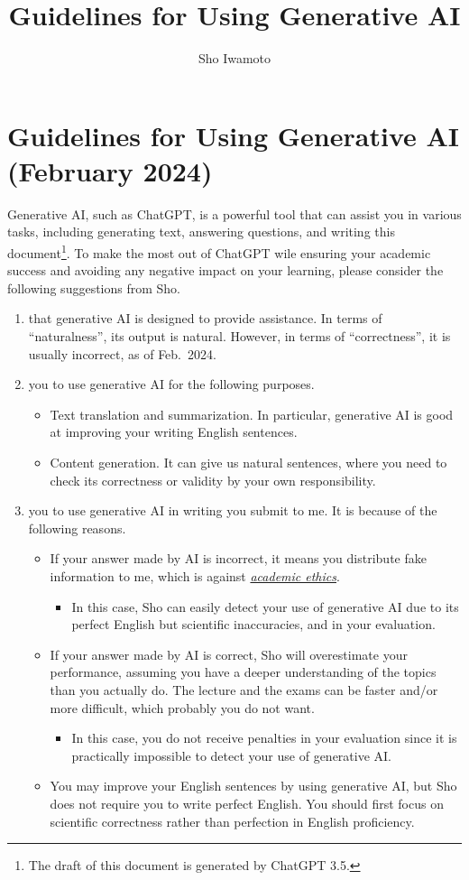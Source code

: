 \documentclass[11pt,pdfa,lastpage]{MishoNote}
\title{Guidelines for Using Generative AI}
\author{Sho Iwamoto}
\begin{document}
\section*{Guidelines for Using Generative AI (February 2024)}

Generative AI, such as ChatGPT, is a powerful tool that can assist you in various tasks, including generating text, answering questions, and writing this document\footnote{The draft of this document is generated by ChatGPT 3.5.}.
To make the most out of ChatGPT wile ensuring your academic success and avoiding any negative impact on your learning, please consider the following suggestions from Sho.
\begin{enumerate}
 \item {} that generative AI is designed to provide assistance.  In terms of ``naturalness'', its output is natural. However, in terms of ``correctness'', it is usually incorrect, as of Feb.~2024.
 \item {} you to use generative AI for the following purposes.
\begin{itemize}
 \item Text translation and summarization. In particular, generative AI is good at improving your writing English sentences.
 \item Content generation. It can give us natural sentences, where you need to check its correctness or validity by your own responsibility.
\end{itemize}
 \item {} you to use generative AI in writing  you submit to me. It is because of the following reasons.
\begin{itemize}
 \item If your answer made by AI is incorrect, it means you distribute fake information to me, which is against \href{https://oaa.nsysu.edu.tw/var/file/3/1003/img/1296/acade_rule_27.pdf}{\em academic ethics}.
\begin{itemize}
 \item In this case, Sho can easily detect your use of generative AI due to its perfect English but scientific inaccuracies, and  in your evaluation.
\end{itemize}
 \item If your answer made by AI is correct, Sho will overestimate your performance, assuming you have a deeper understanding of the topics than you actually do. The lecture and the exams can be faster and/or more difficult, which probably you do not want.
\begin{itemize}
 \item In this case, you do not receive penalties in your evaluation since it is practically impossible to detect your use of generative AI.
\end{itemize}
 \item You may improve your English sentences by using generative AI, but Sho does not require you to write perfect English. You should first focus on scientific correctness rather than perfection in English proficiency.


\end{itemize}
\end{enumerate}
\end{document}
